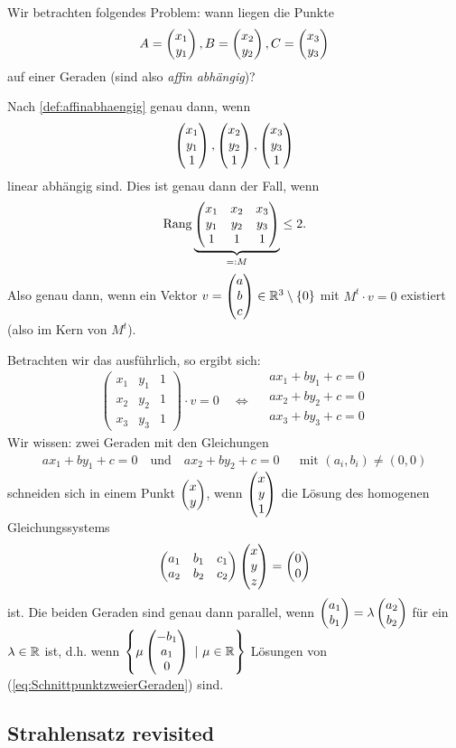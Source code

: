 Wir betrachten folgendes Problem: wann liegen die Punkte
$$
	A = \begin{pmatrix}{x_1}\\{y_1}\end{pmatrix}, B = \begin{pmatrix}{x_2}\\{y_2}\end{pmatrix}, C = \begin{pmatrix}{x_3}\\{y_3}\end{pmatrix}
$$
auf einer Geraden (sind also {\em affin abhängig})?

Nach \ref{def:affinabhaengig} genau dann, wenn
$$
	\begin{pmatrix}{x_1}\\{y_1}\\{1}\end{pmatrix}, \begin{pmatrix}{x_2}\\{y_2}\\{1}\end{pmatrix}, \begin{pmatrix}{x_3}\\{y_3}\\{1}\end{pmatrix}
$$
linear abhängig sind. Dies ist genau dann der Fall, wenn
$$
	\operatorname{Rang}
	\underbrace{
	\begin{pmatrix}
		x_1 & x_2 & x_3\\
		y_1 & y_2 & y_3\\
		1 & 1 & 1
	\end{pmatrix}
	}_{=:M}
	\leq 2.
$$
Also genau dann, wenn ein Vektor $v = \begin{pmatrix}{a}\\{b}\\{c}\end{pmatrix} \in \mathbb R^3 \setminus \{ 0 \}$ mit $M^t \cdot v =
0$ existiert (also im Kern von $M^t$).

Betrachten wir das ausführlich, so ergibt sich:
$$
	\begin{pmatrix}
		x_1 & y_1 & 1\\
		x_2 & y_2 & 1\\
		x_3 & y_3 & 1
	\end{pmatrix}
	\cdot v = 0
	\quad \Leftrightarrow \quad
	\begin{matrix}
		ax_1 + by_1 + c = 0\\
		ax_2 + by_2 + c = 0\\
		ax_3 + by_3 + c = 0\\
	\end{matrix}
$$
Wir wissen: zwei Geraden mit den Gleichungen
\begin{align*}
	ax_1 + by_1 + c = 0 \quad \text{und} \quad ax_2 + by_2 + c = 0 & & \text{mit } (a_i,b_i) \neq
	(0,0)
\end{align*}
schneiden sich in einem Punkt $\begin{pmatrix}{x}\\{y}\end{pmatrix}$, wenn $\begin{pmatrix}{x}\\{y}\\{1}\end{pmatrix}$ die Lösung des homogenen
Gleichungssystems
\begin{equation}\label{eq:SchnittpunktzweierGeraden}
	\begin{pmatrix}
		a_1 & b_1 & c_1\\
		a_2 & b_2 & c_2
	\end{pmatrix}
	\begin{pmatrix}{x}\\{y}\\{z}\end{pmatrix}
	=
	\begin{pmatrix}{0}\\{0}\end{pmatrix}
\end{equation}
ist. Die beiden Geraden sind genau dann parallel, wenn $\begin{pmatrix}{a_1}\\{b_1}\end{pmatrix} = \lambda \begin{pmatrix}{a_2}\\{b_2}\end{pmatrix}$ für
ein $\lambda \in \mathbb R$ ist, d.h. wenn $\left\{ \mu \begin{pmatrix}{-b_1}\\{a_1}\\{0}\end{pmatrix} \ | \ \mu \in \mathbb R \right\}$
Lösungen von (\ref{eq:SchnittpunktzweierGeraden}) sind.

\subsection*{Strahlensatz revisited} %
\label{sub:Strahlensatz revisited}

